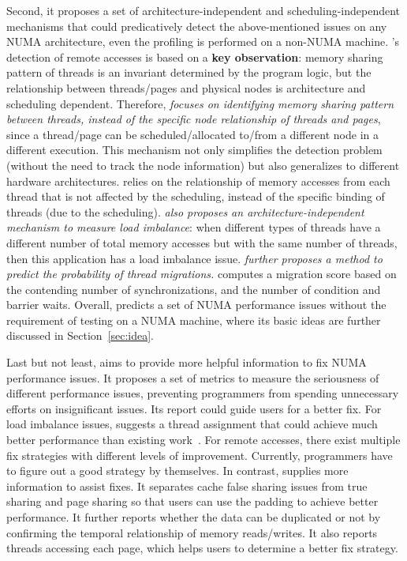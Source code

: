 Second, it proposes a set of architecture-independent and \sloppy scheduling-independent mechanisms that could predicatively detect the above-mentioned issues on any NUMA architecture, even the profiling is performed on a non-NUMA machine. \NP{}'s detection of remote accesses is based on a \textbf{key observation}:  memory sharing pattern of threads is an invariant determined by the program logic, but the relationship between threads/pages and physical nodes is architecture and scheduling dependent. Therefore, \textit{\NP{} focuses on identifying memory sharing pattern between threads, instead of the specific node relationship of threads and pages}, since a thread/page can be scheduled/allocated to/from a different node in a different execution. This mechanism not only simplifies the detection problem (without the need to track the node information) but also generalizes to different hardware architectures.  \NP{} relies on the relationship of memory accesses from each thread that is not affected by the scheduling, instead of the specific binding of threads (due to the scheduling).  \textit{\NP{} also proposes an architecture-independent mechanism to measure load imbalance}: when different types of threads have a different number of total memory accesses but with the same number of threads, then this application has a load imbalance issue. \textit{\NP{} further proposes a method to predict the probability of thread migrations.} \NP{} computes a migration score based on the contending number of synchronizations, and the number of condition and barrier waits. Overall, \NP{} predicts a set of NUMA performance issues without the requirement of testing on a NUMA machine, where its basic ideas are further discussed in Section~\ref{sec:idea}.   

Last but not least, \NP{} aims to provide more helpful information to fix NUMA performance issues. It proposes a set of metrics to measure the seriousness of different performance issues, preventing programmers from spending unnecessary efforts on insignificant issues. Its report could guide users for a better fix. For load imbalance issues, \NP{} suggests a thread assignment that could achieve much better performance than  existing work~\cite{SyncPerf}. For remote accesses, there exist multiple fix strategies with different levels of improvement. Currently, programmers have to figure out a good strategy by themselves. In contrast, \NP{} supplies more information to assist fixes. It separates cache false sharing issues from true sharing and page sharing so that users can use the padding to achieve better performance. It further reports whether the data can be duplicated or not by confirming the temporal relationship of memory reads/writes. It also reports threads accessing each page, which helps users to determine a better fix strategy.  


